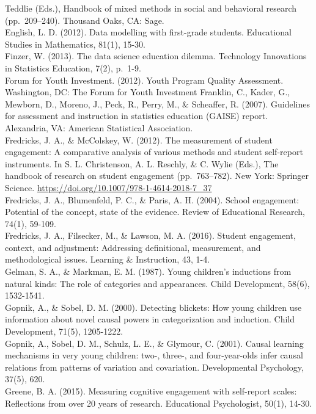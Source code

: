 \documentclass[]{book}
\theoremstyle{definition}
\theoremstyle{definition}
\theoremstyle{definition}
\theoremstyle{remark}
\begin{document}
Teddlie (Eds.), Handbook of mixed methods in social and behavioral
research (pp.~209--240). Thousand Oaks, CA: Sage.\\
English, L. D. (2012). Data modelling with first-grade students.
Educational Studies in Mathematics, 81(1), 15-30.\\
Finzer, W. (2013). The data science education dilemma. Technology
Innovations in Statistics Education, 7(2), p.~1-9.\\
Forum for Youth Investment. (2012). Youth Program Quality Assessment.
Washington, DC: The Forum for Youth Investment Franklin, C., Kader, G.,
Mewborn, D., Moreno, J., Peck, R., Perry, M., \& Scheaffer, R. (2007).
Guidelines for assessment and instruction in statistics education
(GAISE) report. Alexandria, VA: American Statistical Association.\\
Fredricks, J. A., \& McColskey, W. (2012). The measurement of student
engagement: A comparative analysis of various methods and student
self-report instruments. In S. L. Christenson, A. L. Reschly, \& C.
Wylie (Eds.), The handbook of research on student engagement
(pp.~763--782). New York: Springer Science.
\url{https://doi.org/10.1007/978-1-4614-2018-7_37}\\
Fredricks, J. A., Blumenfeld, P. C., \& Paris, A. H. (2004). School
engagement: Potential of the concept, state of the evidence. Review of
Educational Research, 74(1), 59-109.\\
Fredricks, J. A., Filsecker, M., \& Lawson, M. A. (2016). Student
engagement, context, and adjustment: Addressing definitional,
measurement, and methodological issues. Learning \& Instruction, 43,
1-4.\\
Gelman, S. A., \& Markman, E. M. (1987). Young children's inductions
from natural kinds: The role of categories and appearances. Child
Development, 58(6), 1532-1541.\\
Gopnik, A., \& Sobel, D. M. (2000). Detecting blickets: How young
children use information about novel causal powers in categorization and
induction. Child Development, 71(5), 1205-1222.\\
Gopnik, A., Sobel, D. M., Schulz, L. E., \& Glymour, C. (2001). Causal
learning mechanisms in very young children: two-, three-, and
four-year-olds infer causal relations from patterns of variation and
covariation. Developmental Psychology, 37(5), 620.\\
Greene, B. A. (2015). Measuring cognitive engagement with self-report
scales: Reflections from over 20 years of research. Educational
Psychologist, 50(1), 14-30.\\
\end{document}
